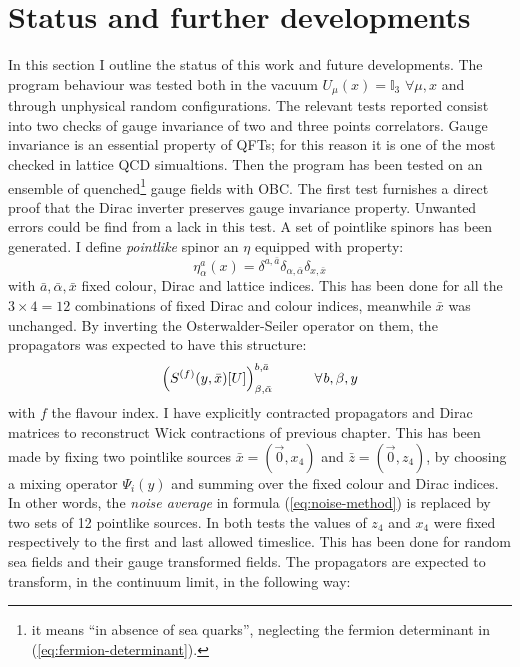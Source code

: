 \documentclass[english, LaM, oneside, noexaminfo]{sapthesis}
\begin{document}
\section{Status and further developments}
\noindent
In this section I outline the status of this work and future developments.
The program behaviour was tested both in the vacuum $U_\mu (x) = \mathbb{I}_3$ $\forall \mu,x$ and through unphysical random configurations.
The relevant tests reported consist into two checks of gauge invariance of two and three points correlators.
Gauge invariance is an essential property of QFTs; for this reason it is one of the most checked in lattice QCD simualtions.
Then the program has been tested on an ensemble of quenched\footnote{it means ``in absence of sea quarks'', neglecting the fermion determinant in (\ref{eq:fermion-determinant}).} gauge fields with OBC.
\newline
The first test furnishes a direct proof that the Dirac inverter preserves gauge invariance property.
Unwanted errors could be find from a lack in this test.
A set of pointlike spinors has been generated.
I define {\it pointlike} spinor an $\eta$ equipped with property:
$$\eta_\alpha^a (x) = \delta^{a,\bar a}\delta_{\alpha, \bar \alpha} \delta_{x,\bar x}$$
with $\bar a, \bar \alpha, \bar x$ fixed colour, Dirac and lattice indices.
This has been done for all the $3\times 4 = 12$ combinations of fixed Dirac and colour indices, meanwhile $\bar x$ was unchanged.
By inverting the Osterwalder-Seiler operator on them, the propagators was expected to have this structure:
\begin{equation*}
    \left(S^{(f)}(y, \bar x)[U]\right)^{b,\bar a}_{\beta, \bar \alpha} \hspace*{1cm} \forall \hspace*{0.3mm} b,\beta,y
\end{equation*}
with $f$ the flavour index.
I have explicitly contracted propagators and Dirac matrices to reconstruct Wick contractions of previous chapter.
This has been made by fixing two pointlike sources $\bar x=(\vec 0, x_4)$ and  $\bar z=(\vec 0, z_4)$, by choosing a mixing operator $\Psi_i (y)$ and summing over the fixed colour and Dirac indices.
In other words, the {\it noise average} in formula (\ref{eq:noise-method}) is replaced by two sets of 12 pointlike sources.
In both tests the values of $z_4$ and $x_4$ were fixed respectively to the first and last allowed timeslice.
This has been done for random sea fields and their gauge transformed fields.
The propagators are expected to transform, in the continuum limit, in the following way:
\end{document}

